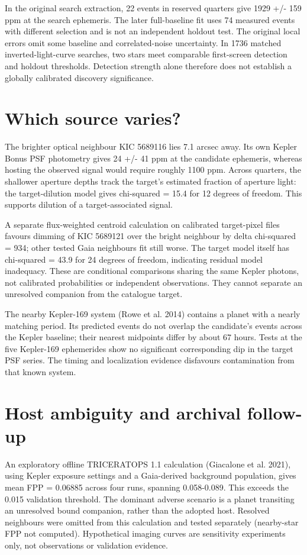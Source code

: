 \documentclass[twocolumn]{aastex7}
\begin{document}
In the original search extraction, 22 events in reserved quarters give 1929 +/- 159 ppm at the search ephemeris. The later full-baseline fit uses 74 measured events with different selection and is not an independent holdout test. The original local errors omit some baseline and correlated-noise uncertainty. In 1736 matched inverted-light-curve searches, two stars meet comparable first-screen detection and holdout thresholds. Detection strength alone therefore does not establish a globally calibrated discovery significance.

\section{Which source varies?}
The brighter optical neighbour KIC 5689116 lies 7.1 arcsec away. Its own Kepler Bonus PSF photometry gives 24 +/- 41 ppm at the candidate ephemeris, whereas hosting the observed signal would require roughly 1100 ppm. Across quarters, the shallower aperture depths track the target's estimated fraction of aperture light: the target-dilution model gives chi-squared = 15.4 for 12 degrees of freedom. This supports dilution of a target-associated signal.

A separate flux-weighted centroid calculation on calibrated target-pixel files favours dimming of KIC 5689121 over the bright neighbour by delta chi-squared = 934; other tested Gaia neighbours fit still worse. The target model itself has chi-squared = 43.9 for 24 degrees of freedom, indicating residual model inadequacy. These are conditional comparisons sharing the same Kepler photons, not calibrated probabilities or independent observations. They cannot separate an unresolved companion from the catalogue target.

The nearby Kepler-169 system (Rowe et al. 2014) contains a planet with a nearly matching period. Its predicted events do not overlap the candidate's events across the Kepler baseline; their nearest midpoints differ by about 67 hours. Tests at the five Kepler-169 ephemerides show no significant corresponding dip in the target PSF series. The timing and localization evidence disfavours contamination from that known system.

\section{Host ambiguity and archival follow-up}
An exploratory offline TRICERATOPS 1.1 calculation (Giacalone et al. 2021), using Kepler exposure settings and a Gaia-derived background population, gives mean FPP = 0.06885 across four runs, spanning 0.058-0.089. This exceeds the 0.015 validation threshold. The dominant adverse scenario is a planet transiting an unresolved bound companion, rather than the adopted host. Resolved neighbours were omitted from this calculation and tested separately (nearby-star FPP not computed). Hypothetical imaging curves are sensitivity experiments only, not observations or validation evidence.
\end{document}
